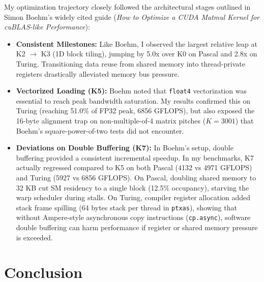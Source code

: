 \documentclass[11pt]{article}
\begin{document}
My optimization trajectory closely followed the architectural stages outlined in Simon Boehm's widely cited guide (\textit{How to Optimize a CUDA Matmul Kernel for cuBLAS-like Performance}):
\begin{itemize}
    \item \textbf{Consistent Milestones:} Like Boehm, I observed the largest relative leap at K2 $\rightarrow$ K3 (1D block tiling), jumping by 5.0x over K0 on Pascal and 2.8x on Turing. Transitioning data reuse from shared memory into thread-private registers drastically alleviated memory bus pressure.
    \item \textbf{Vectorized Loading (K5):} Boehm noted that \texttt{float4} vectorization was essential to reach peak bandwidth saturation. My results confirmed this on Turing (reaching 51.0\% of FP32 peak, 6856 GFLOPS), but also exposed the 16-byte alignment trap on non-multiple-of-4 matrix pitches ($K=3001$) that Boehm's square-power-of-two tests did not encounter.
    \item \textbf{Deviations on Double Buffering (K7):} In Boehm's setup, double buffering provided a consistent incremental speedup. In my benchmarks, K7 actually regressed compared to K5 on both Pascal (4132 vs 4971 GFLOPS) and Turing (5927 vs 6856 GFLOPS). On Pascal, doubling shared memory to 32 KB cut SM residency to a single block (12.5\% occupancy), starving the warp scheduler during stalls. On Turing, compiler register allocation added stack frame spilling (64 bytes stack per thread in \texttt{ptxas}), showing that without Ampere-style asynchronous copy instructions (\texttt{cp.async}), software double buffering can harm performance if register or shared memory pressure is exceeded.
\end{itemize}

\section{Conclusion}
\end{document}
